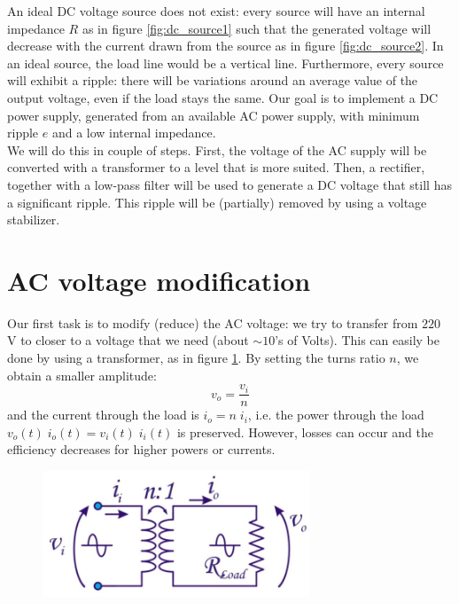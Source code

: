An ideal DC voltage source does not exist: every source will have an internal impedance $R$ as in figure \ref{fig:dc_source1} such that the generated voltage will decrease with the current drawn from the source as in figure \ref{fig:dc_source2}. In an ideal source, the load line would be a vertical line. Furthermore, every source will exhibit a ripple: there will be variations around an average value of the output voltage, even if the load stays the same. Our goal is to implement a DC power supply, generated from an available AC power supply, with minimum ripple $e$ and a low internal impedance.\\
We will do this in couple of steps. First, the voltage of the AC supply will be converted with a transformer to a level that is more suited. Then, a rectifier, together with a low-pass filter will be used to generate a DC voltage that still has a significant ripple. This ripple will be (partially) removed by using a voltage stabilizer.

\section{AC voltage modification}
Our first task is to modify (reduce) the AC voltage: we try to transfer from $220$ V to closer to a voltage that we need (about $\sim 10$'s of Volts). This can easily be done by using a transformer, as in figure \ref{fig:transformer1}. By setting the turns ratio $n$, we obtain a smaller amplitude:
$$
v_o = \frac{v_i}{n}
$$
and the current through the load is $i_o = n \; i_i$, i.e. the power through the load $v_o(t) \; i_o(t) = v_i(t) \; i_i(t)$ is preserved. However, losses can occur and the efficiency decreases for higher powers or currents.
	
\begin{figure}[h!]
	\centering
	\includegraphics[width=8cm]{figures/ch12/transformer1.jpg}
	\caption{}
	\label{fig:transformer1}
\end{figure}

